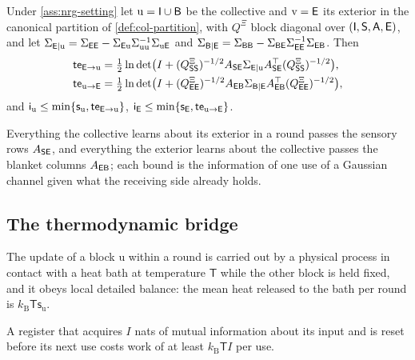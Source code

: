 \begin{corollary}\label{cor:nrg-blanket-flow}
Under \cref{ass:nrg-setting} let $\mathrm u=\mathsf{I}\cup\mathsf{B}$ be the collective and $\mathrm v=\mathsf{E}$ its exterior in the canonical partition of \cref{def:col-partition}, with $Q^{\Xi}$ block diagonal over $(\mathsf{I},\mathsf{S},\mathsf{A},\mathsf{E})$, and let $\Sigma_{\mathsf{E}\mid\mathrm u}=\Sigma_{\mathsf{E}\mathsf{E}}-\Sigma_{\mathsf{E}\mathrm u}\Sigma_{\mathrm{uu}}^{-1}\Sigma_{\mathrm u\mathsf{E}}$ and $\Sigma_{\mathsf{B}\mid\mathsf{E}}=\Sigma_{\mathsf{B}\mathsf{B}}-\Sigma_{\mathsf{B}\mathsf{E}}\Sigma_{\mathsf{E}\mathsf{E}}^{-1}\Sigma_{\mathsf{E}\mathsf{B}}$. Then
\begin{equation}\label{eq:nrg-blanket-te}
\begin{aligned}
\mathsf{te}_{\mathsf{E}\to\mathrm u}&=\tfrac12\ln\det\bigl(I+(Q^{\Xi}_{\mathsf{S}\mathsf{S}})^{-1/2}A_{\mathsf{S}\mathsf{E}}\Sigma_{\mathsf{E}\mid\mathrm u}A_{\mathsf{S}\mathsf{E}}^\top(Q^{\Xi}_{\mathsf{S}\mathsf{S}})^{-1/2}\bigr),\\
\mathsf{te}_{\mathrm u\to\mathsf{E}}&=\tfrac12\ln\det\bigl(I+(Q^{\Xi}_{\mathsf{E}\mathsf{E}})^{-1/2}A_{\mathsf{E}\mathsf{B}}\Sigma_{\mathsf{B}\mid\mathsf{E}}A_{\mathsf{E}\mathsf{B}}^\top(Q^{\Xi}_{\mathsf{E}\mathsf{E}})^{-1/2}\bigr),
\end{aligned}
\end{equation}
and $\mathsf i_{\mathrm u}\le\min\{\mathsf s_{\mathrm u},\mathsf{te}_{\mathsf{E}\to\mathrm u}\}$, $\mathsf i_{\mathsf{E}}\le\min\{\mathsf s_{\mathsf{E}},\mathsf{te}_{\mathrm u\to\mathsf{E}}\}$.
\end{corollary}

Everything the collective learns about its exterior in a round passes the sensory rows $A_{\mathsf{S}\mathsf{E}}$, and everything the exterior learns about the collective passes the blanket columns $A_{\mathsf{E}\mathsf{B}}$; each bound is the information of one use of a Gaussian channel given what the receiving side already holds.

\subsection{The thermodynamic bridge}\label{sec:nrg-bridge}

\begin{premise}\label{prem:nrg-bath}
The update of a block $\mathrm u$ within a round is carried out by a physical process in contact with a heat bath at temperature $\mathsf T$ while the other block is held fixed, and it obeys local detailed balance: the mean heat released to the bath per round is $k_{\mathrm B}\mathsf T\mathsf s_{\mathrm u}$.
\end{premise}

\begin{premise}[Registers]\label{prem:nrg-register}
A register that acquires $I$ nats of mutual information about its input and is reset before its next use costs work of at least $k_{\mathrm B}\mathsf TI$ per use.
\end{premise}

